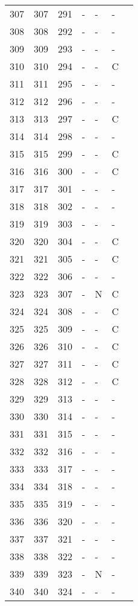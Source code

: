 \begin{longtable}{rrrllll}
  307 & 307 & 291 & - & - & - &  \\ 
  308 & 308 & 292 & - & - & - &  \\ 
  309 & 309 & 293 & - & - & - &  \\ 
  310 & 310 & 294 & - & - & C &  \\ 
  311 & 311 & 295 & - & - & - &  \\ 
  312 & 312 & 296 & - & - & - &  \\ 
  313 & 313 & 297 & - & - & C &  \\ 
  314 & 314 & 298 & - & - & - &  \\ 
  315 & 315 & 299 & - & - & C &  \\ 
  316 & 316 & 300 & - & - & C &  \\ 
  317 & 317 & 301 & - & - & - &  \\ 
  318 & 318 & 302 & - & - & - &  \\ 
  319 & 319 & 303 & - & - & - &  \\ 
  320 & 320 & 304 & - & - & C &  \\ 
  321 & 321 & 305 & - & - & C &  \\ 
  322 & 322 & 306 & - & - & - &  \\ 
  323 & 323 & 307 & - & N & C &  \\ 
  324 & 324 & 308 & - & - & C &  \\ 
  325 & 325 & 309 & - & - & C &  \\ 
  326 & 326 & 310 & - & - & C &  \\ 
  327 & 327 & 311 & - & - & C &  \\ 
  328 & 328 & 312 & - & - & C &  \\ 
  329 & 329 & 313 & - & - & - &  \\ 
  330 & 330 & 314 & - & - & - &  \\ 
  331 & 331 & 315 & - & - & - &  \\ 
  332 & 332 & 316 & - & - & - &  \\ 
  333 & 333 & 317 & - & - & - &  \\ 
  334 & 334 & 318 & - & - & - &  \\ 
  335 & 335 & 319 & - & - & - &  \\ 
  336 & 336 & 320 & - & - & - &  \\ 
  337 & 337 & 321 & - & - & - &  \\ 
  338 & 338 & 322 & - & - & - &  \\ 
  339 & 339 & 323 & - & N & - &  \\ 
  340 & 340 & 324 & - & - & - &  \\ 

\end{longtable}
